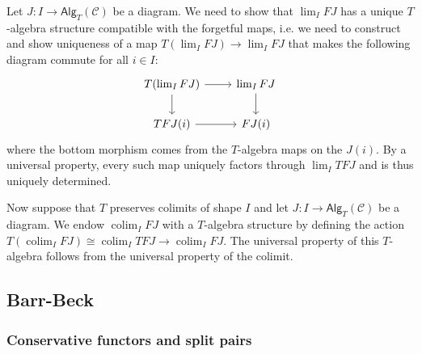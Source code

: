 \documentclass[10pt]{article}
\newcommand{\ccat}{\mathcal{C}}
\newcommand{\Alg}{\mathsf{Alg}}
\DeclareMathOperator*{\colim}{colim}
\begin{document}
\begin{itemize}
                    Let $J\colon I\to\Alg_T(\ccat)$ be a diagram.
                    We need to show that $\lim_I FJ$ has a unique $T$-algebra structure compatible with the forgetful maps, i.e. we need to construct and show uniqueness of a map $T(\lim_I FJ)\to\lim_I FJ$ that makes the following diagram commute for all $i\in I$:
                    \begin{equation*}
                        \begin{tikzcd}
                            T(\lim_I FJ) \rar \dar
                            & \lim_I FJ \dar\\
                            TFJ(i) \rar
                            & FJ(i)
                        \end{tikzcd}
                    \end{equation*}
                    where the bottom morphism comes from the $T$-algebra maps on the $J(i)$.
                    By a universal property, every such map uniquely factors through $\lim_I TFJ$ and is thus uniquely determined.

                    Now suppose that $T$ preserves colimits of shape $I$ and let $J\colon I\to\Alg_T(\ccat)$ be a diagram.
                    We endow $\colim_I FJ$ with a $T$-algebra structure by defining the action $T(\colim_I FJ)\cong\colim_I TFJ\to\colim_I FJ$.
                    The universal property of this $T$-algebra follows from the universal property of the colimit.
            \end{itemize}

        \subsection{Barr-Beck}

            \subsubsection{Conservative functors and split pairs}
\end{document}
